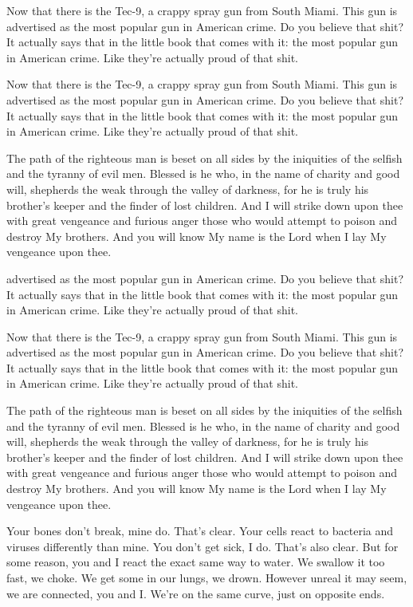 \documentclass[11pt,twoside,a5paper,landscape,openright]{book}
\begin{document}
Now that there is the Tec-9, a crappy spray gun from South Miami. This gun is advertised as the most popular gun in American crime. Do you believe that shit? It actually says that in the little book that comes with it: the most popular gun in American crime. Like they're actually proud of that shit. 

Now that there is the Tec-9, a crappy spray gun from South Miami. This gun is advertised as the most popular gun in American crime. Do you believe that shit? It actually says that in the little book that comes with it: the most popular gun in American crime. Like they're actually proud of that shit. 

The path of the righteous man is beset on all sides by the iniquities of the selfish and the tyranny of evil men. Blessed is he who, in the name of charity and good will, shepherds the weak through the valley of darkness, for he is truly his brother's keeper and the finder of lost children. And I will strike down upon thee with great vengeance and furious anger those who would attempt to poison and destroy My brothers. And you will know My name is the Lord when I lay My vengeance upon thee.

advertised as the most popular gun in American crime. Do you believe that shit? It actually says that in the little book that comes with it: the most popular gun in American crime. Like they're actually proud of that shit. 

Now that there is the Tec-9, a crappy spray gun from South Miami. This gun is advertised as the most popular gun in American crime. Do you believe that shit? It actually says that in the little book that comes with it: the most popular gun in American crime. Like they're actually proud of that shit. 

The path of the righteous man is beset on all sides by the iniquities of the selfish and the tyranny of evil men. Blessed is he who, in the name of charity and good will, shepherds the weak through the valley of darkness, for he is truly his brother's keeper and the finder of lost children. And I will strike down upon thee with great vengeance and furious anger those who would attempt to poison and destroy My brothers. And you will know My name is the Lord when I lay My vengeance upon thee.

Your bones don't break, mine do. That's clear. Your cells react to bacteria and viruses differently than mine. You don't get sick, I do. That's also clear. But for some reason, you and I react the exact same way to water. We swallow it too fast, we choke. We get some in our lungs, we drown. However unreal it may seem, we are connected, you and I. We're on the same curve, just on opposite ends.
\end{document}
